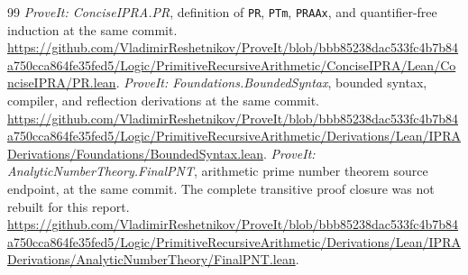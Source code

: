 \documentclass[11pt,letterpaper]{article}
\theoremstyle{definition}
\theoremstyle{remark}
\begin{document}
\begin{thebibliography}{99}
 \emph{ProveIt: ConciseIPRA.PR}, definition of \texttt{PR}, \texttt{PTm}, \texttt{PRAAx}, and quantifier-free induction at the same commit. \url{https://github.com/VladimirReshetnikov/ProveIt/blob/bbb85238dac533fc4b7b84a750cca864fe35fed5/Logic/PrimitiveRecursiveArithmetic/ConciseIPRA/Lean/ConciseIPRA/PR.lean}.
 \emph{ProveIt: Foundations.BoundedSyntax}, bounded syntax, compiler, and reflection derivations at the same commit. \url{https://github.com/VladimirReshetnikov/ProveIt/blob/bbb85238dac533fc4b7b84a750cca864fe35fed5/Logic/PrimitiveRecursiveArithmetic/Derivations/Lean/IPRADerivations/Foundations/BoundedSyntax.lean}.
 \emph{ProveIt: AnalyticNumberTheory.FinalPNT}, arithmetic prime number theorem source endpoint, at the same commit. The complete transitive proof closure was not rebuilt for this report. \url{https://github.com/VladimirReshetnikov/ProveIt/blob/bbb85238dac533fc4b7b84a750cca864fe35fed5/Logic/PrimitiveRecursiveArithmetic/Derivations/Lean/IPRADerivations/AnalyticNumberTheory/FinalPNT.lean}.
\end{thebibliography}
\end{document}
